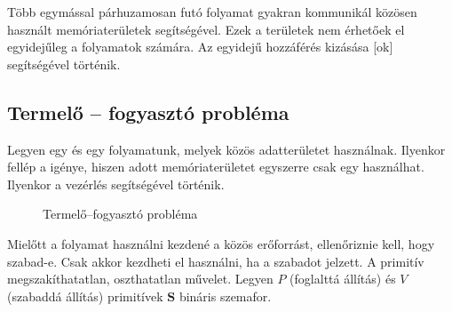 \documentclass[../main.tex]{subfiles}
\begin{document}
Több egymással párhuzamosan futó folyamat gyakran kommunikál közösen használt
memóriaterületek segítségével. Ezek a területek nem érhetőek el egyidejűleg a
folyamatok számára. Az egyidejű hozzáférés kizásása [ok]
segítségével történik.

\subsection{Termelő -- fogyasztó probléma}

Legyen egy  és egy  folyamatunk, melyek közös
adatterületet használnak. Ilyenkor fellép a  igénye,
hiszen adott memóriaterületet egyszerre csak egy  használhat.
Ilyenkor a vezérlés  segítségével történik.

\begin{figure}[H]
  \centering
  \caption{Termelő--fogyasztó probléma}
  \label{fig:semafor}
\end{figure}

Mielőtt a folyamat használni kezdené a közös erőforrást, ellenőriznie kell,
hogy szabad-e. Csak akkor kezdheti el használni, ha a  szabadot
jelzett. A primitív megszakíthatatlan, oszthatatlan művelet.
Legyen $P$ (foglalttá állítás) és $V$ (szabaddá állítás) primitívek
$\mathbf{S}$ bináris szemafor.
\end{document}
